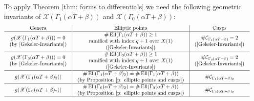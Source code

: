 \documentclass[11pt]{amsart}
\theoremstyle{definition}
\numberwithin{equation}{section}
\newcommand{\cC}{\mathcal{C}}		%
\newcommand{\sX}{\mathscr{X}}		%
\begin{document}
To apply Theorem \ref{thm: forms to differentials} we need the following geometric invariants of $\sX(\Gamma_1(\alpha T+\beta))$ and $\sX(\Gamma_0(\alpha T+\beta))$:
\[\begin{array}{c|c|c}
\text{Genera}&\text{Elliptic points}&\text{Cusps}\\
\hline
\begin{array}{c}g(\sX(\Gamma_1(\alpha T+\beta)))=0\\\text{(by \cite[Thm $8.1.(\mathrm{ii})$]{Gekeler-Invariants})}\end{array}&
\begin{array}{c}\#\operatorname{Ell}(\Gamma_1(\alpha T+\beta))\geq1\\
	\text{ramified with index }q+1\text{ over }X(1)\\
	\text{(\cite[Proposition $7.2$]{Gekeler-Invariants})}\end{array}&
\begin{array}{c}\#\cC_{\Gamma_1(\alpha T+\beta)}=2\\\text{(\cite[Proposition $6.6.(\mathrm{i})$]{Gekeler-Invariants})}\end{array}\\
\hline
\begin{array}{c}g(\sX(\Gamma_0(\alpha T+\beta)))=0\\\text{(by \cite[Thm $8.1.(\mathrm{iii})$]{Gekeler-Invariants})}\end{array}&\begin{array}{c}\#\operatorname{Ell}(\Gamma_0(\alpha T+\beta))\geq1\\	\text{ramified with index }q+1\text{ over }X(1)\\\text{(\cite[Proposition $7.3$]{Gekeler-Invariants})}\end{array}&\begin{array}{c}\#\cC_{\Gamma_0(\alpha T+\beta)}=2\\\text{(\cite[Proposition $6.7.(\mathrm{i})$]{Gekeler-Invariants})}\end{array}\\
\hline
g(\sX(\Gamma_1(\alpha T+\beta)_2)) &\begin{array}{c}\#\operatorname{Ell}(\Gamma_1(\alpha T+\beta)_2)=\#\operatorname{Ell}(\Gamma_1(\alpha T+\beta))\\\text{(by Proposition \ref{p: elliptic points and cusps})}\end{array}&\#\cC_{\Gamma_1(\alpha T+\beta)_2}\\
\hline
g(\sX(\Gamma_0(\alpha T+\beta)_2)) &\begin{array}{c}\#\operatorname{Ell}(\Gamma_0(\alpha T+\beta)_2)=\#\operatorname{Ell}(\Gamma_0(\alpha T+\beta))\\\text{(by Proposition \ref{p: elliptic points and cusps})}\end{array}&\#\cC_{\Gamma_0(\alpha T+\beta)_2}\\
\hline
\end{array}\]
\end{document}
